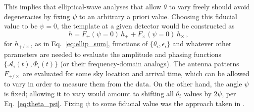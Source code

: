\documentclass[aps,prd,twocolumn,superscriptaddress,preprintnumbers,floatfix,nofootinbib]{revtex4-2}
\begin{document}
This implies that elliptical-wave analyses that allow $\theta$ to vary freely should avoid degeneracies by fixing $\psi$ to an arbitrary a priori value.
Choosing this fiducial value to be $\psi=0$, the template at a given detector would be constructed as
\begin{equation}
h = F_+(\psi=0)\, h_+ + F_\times(\psi=0)\,  h_\times \, ,
\end{equation}
for $h_{+/\times}$, as in Eq.~\eqref{eq:ellip_sum}, functions of $\{\theta_i, \epsilon_i\}$ and whatever other parameters are needed to evaluate the amplitude and phasing functions $\{\mathcal{A}_i(t), \Phi_i(t)\}$ (or their frequency-domain analogs).
The antenna patterns $F_{+/\times}$ are evaluated for some sky location and arrival time, which can be allowed to vary in order to measure them from the data.
On the other hand, the angle $\psi$ is fixed; allowing it to vary would amount to shifting all $\theta_i$ values by $2\psi$, per Eq.~\eqref{eq:theta_psi}.
Fixing $\psi$ to some fiducial value was the approach taken in \cite{Isi:2017equ,Chatziioannou:2021mij,Isi:2021iql}.




\end{document}
